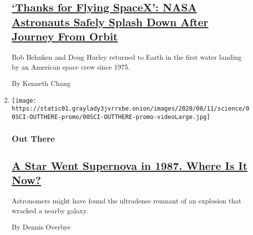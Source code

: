 \begin{enumerate}
{  \subsection{\texorpdfstring{\href{/2020/08/02/science/spacex-astronauts-splashdown.html}{`Thanks
  for Flying SpaceX': NASA Astronauts Safely Splash Down After Journey
  From
  Orbit}}{`Thanks for Flying SpaceX': NASA Astronauts Safely Splash Down After Journey From Orbit}}\label{thanks-for-flying-spacex-nasa-astronauts-safely-splash-down-after-journey-from-orbit}}

  Bob Behnken and Doug Hurley returned to Earth in the first water
  landing by an American space crew since 1975.

  By Kenneth Chang
\item
  \texttt{[image: https://static01.graylady3jvrrxbe.onion/images/2020/08/11/science/00SCI-OUTTHERE-promo/00SCI-OUTTHERE-promo-videoLarge.jpg]}

  \hypertarget{out-there-1}{%
  \subsubsection{Out There}\label{out-there-1}}

  \hypertarget{a-star-went-supernova-in-1987-where-is-it-now}{%
  \subsection{\texorpdfstring{\href{/2020/08/07/science/supernova-neutron-star-sn1987a.html}{A
  Star Went Supernova in 1987. Where Is It
  Now?}}{A Star Went Supernova in 1987. Where Is It Now?}}\label{a-star-went-supernova-in-1987-where-is-it-now}}

  Astronomers might have found the ultradense remnant of an explosion
  that wracked a nearby galaxy.

  By Dennis Overbye
\end{enumerate}

